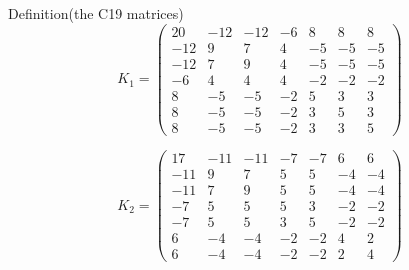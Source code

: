 \documentclass[11pt]{amsart}
\begin{document}
\begin{namedresult}{Definition}{(the C19 matrices)}
\[
 K_1=
 \begin{pmatrix}
 20&-12&-12&-6&8&8&8\\
 -12&9&7&4&-5&-5&-5\\
 -12&7&9&4&-5&-5&-5\\
 -6&4&4&4&-2&-2&-2\\
 8&-5&-5&-2&5&3&3\\
 8&-5&-5&-2&3&5&3\\
 8&-5&-5&-2&3&3&5
 \end{pmatrix}
\]

\[
 K_2=
 \begin{pmatrix}
 17&-11&-11&-7&-7&6&6\\
 -11&9&7&5&5&-4&-4\\
 -11&7&9&5&5&-4&-4\\
 -7&5&5&5&3&-2&-2\\
 -7&5&5&3&5&-2&-2\\
 6&-4&-4&-2&-2&4&2\\
 6&-4&-4&-2&-2&2&4
 \end{pmatrix}
\]
\end{namedresult}
\end{document}
